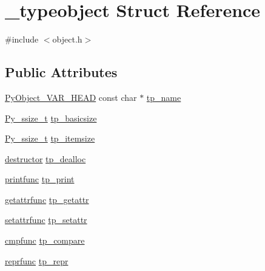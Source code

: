 \hypertarget{struct__typeobject}{}\section{\+\_\+typeobject Struct Reference}
\label{struct__typeobject}


{\ttfamily \#include $<$object.\+h$>$}

\subsection*{Public Attributes}
\begin{DoxyCompactItemize}
\item 
\mbox{\hyperlink{_python27_2object_8h_aa0eba161a76be8710b3de325c2e7f9e2}{Py\+Object\+\_\+\+V\+A\+R\+\_\+\+H\+E\+AD}} const char $\ast$ \mbox{\hyperlink{struct__typeobject_ac5e735ef4e5e666b94668cbed5a08901}{tp\+\_\+name}}
\item 
\mbox{\hyperlink{pyport_8h_ac6411a3dfda9ac6feb9e8d859b1184bc}{Py\+\_\+ssize\+\_\+t}} \mbox{\hyperlink{struct__typeobject_aede3a7181d6d3c0560c44740b805ac00}{tp\+\_\+basicsize}}
\item 
\mbox{\hyperlink{pyport_8h_ac6411a3dfda9ac6feb9e8d859b1184bc}{Py\+\_\+ssize\+\_\+t}} \mbox{\hyperlink{struct__typeobject_aa2f823359e194b776476771c4b4a0a99}{tp\+\_\+itemsize}}
\item 
\mbox{\hyperlink{pycapsule_8h_a51509651aa95ca080a474808eb5c8544}{destructor}} \mbox{\hyperlink{struct__typeobject_a340396d33c324118bdda0a521bf235fb}{tp\+\_\+dealloc}}
\item 
\mbox{\hyperlink{_python27_2object_8h_a8f688973092faa2442e9d5210aab8aae}{printfunc}} \mbox{\hyperlink{struct__typeobject_a9b6d17094356175c542e007464cae33f}{tp\+\_\+print}}
\item 
\mbox{\hyperlink{_python27_2object_8h_afe85498fb57ac8736e9e6a064f839445}{getattrfunc}} \mbox{\hyperlink{struct__typeobject_a08abee6f5a4acecaf660eebadd013d09}{tp\+\_\+getattr}}
\item 
\mbox{\hyperlink{_python27_2object_8h_a5d61fb429f16948d39f999466b5e99dd}{setattrfunc}} \mbox{\hyperlink{struct__typeobject_a83b13e804c97dd0941b6531cfd501640}{tp\+\_\+setattr}}
\item 
\mbox{\hyperlink{_python27_2object_8h_ae7d6d3cd926c5f2bb04300cb817821a5}{cmpfunc}} \mbox{\hyperlink{struct__typeobject_a06daf7e992e2f8bdf44d7a9c7f5eab6f}{tp\+\_\+compare}}
\item 
\mbox{\hyperlink{_python27_2object_8h_a880e8271f8f3f984e0baecc0255c312f}{reprfunc}} \mbox{\hyperlink{struct__typeobject_a3eb42d25116ad9a0ee140669e7a9a50c}{tp\+\_\+repr}}

\end{DoxyCompactItemize}
